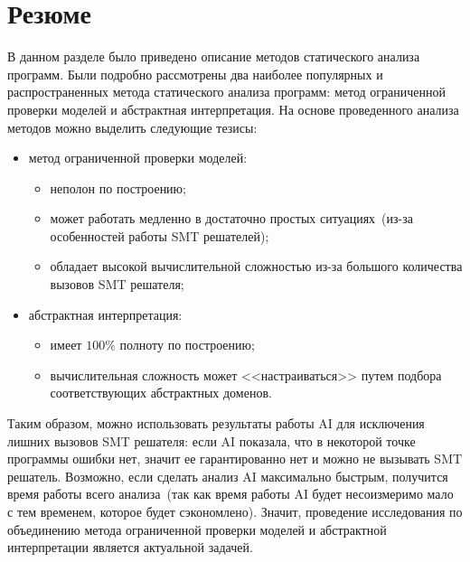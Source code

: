 \section{Резюме}
В данном разделе было приведено описание методов статического анализа 
программ. Были подробно рассмотрены два наиболее популярных и распространенных
метода статического анализа программ: метод ограниченной проверки моделей и
абстрактная интерпретация. На основе проведенного анализа методов можно 
выделить следующие тезисы:
\begin{itemize}
\item метод ограниченной проверки моделей:
	\begin{itemize}
	\item неполон по построению;
	\item может работать медленно в достаточно простых ситуациях~(из-за 
	особенностей работы SMT решателей);
	\item обладает высокой вычислительной сложностью из-за большого количества
	вызовов SMT решателя;
	\end{itemize}
\item абстрактная интерпретация:
	\begin{itemize}
	\item имеет $100\%$ полноту по построению;
	\item вычислительная сложность может <<настраиваться>> путем подбора
	соответствующих абстрактных доменов.
	\end{itemize}
\end{itemize}

Таким образом, можно использовать результаты работы AI для исключения 
лишних вызовов SMT решателя: если AI показала, что в некоторой точке программы 
ошибки нет, значит ее гарантированно нет и можно не вызывать SMT решатель. 
Возможно, если сделать анализ AI максимально быстрым, получится время работы 
всего анализа~(так как время работы AI будет несоизмеримо мало с тем временем, 
которое будет сэкономлено). Значит, проведение исследования по объединению 
метода ограниченной проверки моделей и абстрактной интерпретации является 
актуальной задачей.